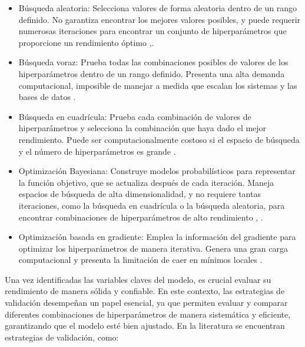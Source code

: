 \begin{itemize}
	\item Búsqueda aleatoria: Selecciona valores de forma aleatoria dentro de un rango definido. No garantiza encontrar los mejores valores posibles, y puede requerir numerosas iteraciones para encontrar un conjunto de hiperparámetros que proporcione un rendimiento óptimo \citep{geron2022hands},\citep{zoller2021benchmark}.
	\item Búsqueda voraz: Prueba todas las combinaciones posibles de valores de los hiperparámetros dentro de un rango definido. Presenta una alta demanda computacional, imposible de manejar a medida que escalan los sistemas y las bases de datos \citep{zoller2021benchmark}.
	\item Búsqueda en cuadrícula: Prueba cada combinación de valores de hiperparámetros y selecciona la combinación que haya dado el mejor rendimiento. Puede ser computacionalmente costoso si el espacio de búsqueda y el número de hiperparámetros es grande \citep{he2021automl}.
	\item Optimización Bayesiana: Construye modelos probabilísticos para representar la función objetivo, que se actualiza después de cada iteración. Maneja espacios de búsqueda de alta dimensionalidad, y no requiere tantas iteraciones, como la búsqueda en cuadrícula o la búsqueda aleatoria, para encontrar combinaciones de hiperparámetros de alto rendimiento \citep{hutter2019automated}, \citep{he2021automl}.
	\item Optimización basada en gradiente: Emplea la información del gradiente para optimizar los hiperparámetros de manera iterativa. Genera una gran carga computacional y presenta la limitación de caer en mínimos locales \citep{zoller2021benchmark}.
\end{itemize} 

Una vez identificadas las variables claves del modelo, es crucial evaluar su rendimiento de manera sólida y confiable. En este contexto, las estrategias de validación desempeñan un papel esencial, ya que permiten evaluar y comparar diferentes combinaciones de hiperparámetros de manera sistemática y eficiente, garantizando que el modelo esté bien ajustado. En la literatura se encuentran estrategias de validación, como:

